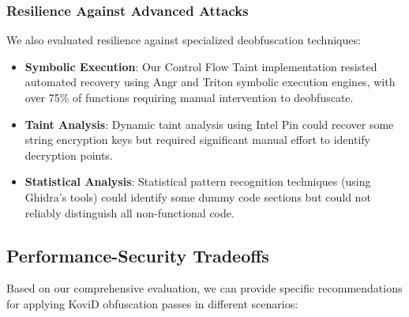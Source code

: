 \documentclass[conference]{IEEEtran}
\begin{document}
\subsubsection{Resilience Against Advanced Attacks}
We also evaluated resilience against specialized deobfuscation techniques:

\begin{itemize}
    \item \textbf{Symbolic Execution}: Our Control Flow Taint implementation resisted automated recovery using Angr and Triton symbolic execution engines, with over 75\% of functions requiring manual intervention to deobfuscate.
    
    \item \textbf{Taint Analysis}: Dynamic taint analysis using Intel Pin could recover some string encryption keys but required significant manual effort to identify decryption points.
    
    \item \textbf{Statistical Analysis}: Statistical pattern recognition techniques (using Ghidra's tools) could identify some dummy code sections but could not reliably distinguish all non-functional code.
\end{itemize}

\subsection{Performance-Security Tradeoffs}

Based on our comprehensive evaluation, we can provide specific recommendations for applying KoviD obfuscation passes in different scenarios:
\end{document}
